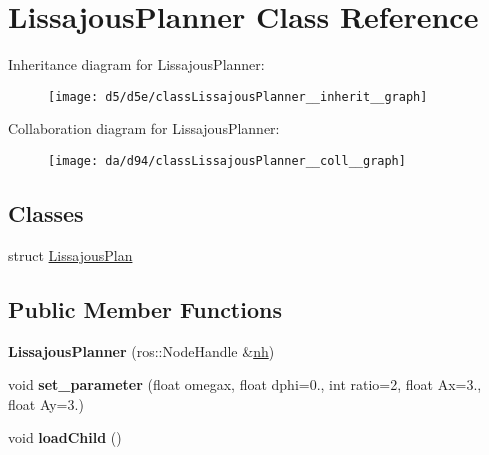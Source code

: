 \hypertarget{classLissajousPlanner}{}\section{Lissajous\+Planner Class Reference}
\label{classLissajousPlanner}


Inheritance diagram for Lissajous\+Planner\+:\nopagebreak
\begin{figure}[H]
\begin{center}
\leavevmode
\texttt{[image: d5/d5e/classLissajousPlanner\_\_inherit\_\_graph]}
\end{center}
\end{figure}


Collaboration diagram for Lissajous\+Planner\+:\nopagebreak
\begin{figure}[H]
\begin{center}
\leavevmode
\texttt{[image: da/d94/classLissajousPlanner\_\_coll\_\_graph]}
\end{center}
\end{figure}
\subsection*{Classes}
\begin{DoxyCompactItemize}
\item 
struct \hyperlink{structLissajousPlanner_1_1LissajousPlan}{Lissajous\+Plan}
\end{DoxyCompactItemize}
\subsection*{Public Member Functions}
\begin{DoxyCompactItemize}
\item 
{\bfseries Lissajous\+Planner} (ros\+::\+Node\+Handle \&\hyperlink{classPlanner_a9714d036f444a07ce90be8d135b9a40c}{nh})\hypertarget{classLissajousPlanner_a82095ebb2cd29944a201321377fc78fe}{}\label{classLissajousPlanner_a82095ebb2cd29944a201321377fc78fe}

\item 
void {\bfseries set\+\_\+parameter} (float omegax, float dphi=0., int ratio=2, float Ax=3., float Ay=3.)\hypertarget{classLissajousPlanner_aa6e4d941a535dca182aaf8b73b5a0dcd}{}\label{classLissajousPlanner_aa6e4d941a535dca182aaf8b73b5a0dcd}

\item 
void {\bfseries load\+Child} ()\hypertarget{classLissajousPlanner_a09e5a547d33d13fbf4a27fdf0ba91b57}{}\label{classLissajousPlanner_a09e5a547d33d13fbf4a27fdf0ba91b57}

\end{DoxyCompactItemize}
